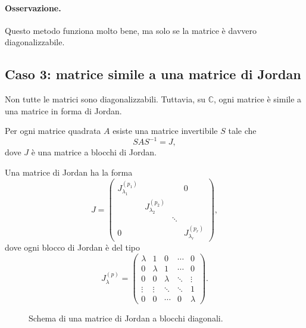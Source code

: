 \paragraph{Osservazione.}
Questo metodo funziona molto bene, ma solo se la matrice è davvero diagonalizzabile.

\subsection{Caso 3: matrice simile a una matrice di Jordan}

Non tutte le matrici sono diagonalizzabili. Tuttavia, su $\mathbb{C}$, ogni matrice è simile a una matrice in forma di Jordan.

\begin{teorema}
Per ogni matrice quadrata $A$ esiste una matrice invertibile $S$ tale che
\[
SAS^{-1}=J,
\]
dove $J$ è una matrice a blocchi di Jordan.
\end{teorema}

Una matrice di Jordan ha la forma
\[
J=
\begin{pmatrix}
J_{\lambda_1}^{(p_1)} & & & 0\\
& J_{\lambda_2}^{(p_2)} & & \\
& & \ddots & \\
0 & & & J_{\lambda_r}^{(p_r)}
\end{pmatrix},
\]
dove ogni blocco di Jordan è del tipo
\begin{equation}
J_\lambda^{(p)}=
\begin{pmatrix}
\lambda & 1 & 0 & \cdots & 0\\
0 & \lambda & 1 & \cdots & 0\\
0 & 0 & \lambda & \ddots & \vdots\\
\vdots & \vdots & \ddots & \ddots & 1\\
0 & 0 & \cdots & 0 & \lambda
\end{pmatrix}.
\label{eq:L5_jordan_block}
\end{equation}

\begin{figure}[H]
\centering
{}
\caption{Schema di una matrice di Jordan a blocchi diagonali.}
\end{figure}

